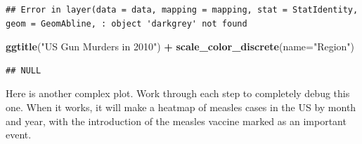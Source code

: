 \documentclass[
]{book}
\newenvironment{Shaded}{\begin{snugshade}}{\end{snugshade}}
\newcommand{\DataTypeTok}[1]{\textcolor[rgb]{0.13,0.29,0.53}{#1}}
\newcommand{\KeywordTok}[1]{\textcolor[rgb]{0.13,0.29,0.53}{\textbf{#1}}}
\newcommand{\NormalTok}[1]{#1}
\newcommand{\OperatorTok}[1]{\textcolor[rgb]{0.81,0.36,0.00}{\textbf{#1}}}
\newcommand{\StringTok}[1]{\textcolor[rgb]{0.31,0.60,0.02}{#1}}
\begin{document}
\begin{verbatim}
## Error in layer(data = data, mapping = mapping, stat = StatIdentity, geom = GeomAbline, : object 'darkgrey' not found
\end{verbatim}

\begin{Shaded}
\begin{Highlighting}[]
  \KeywordTok{ggtitle}\NormalTok{(}\StringTok{"US Gun Murders in 2010"}\NormalTok{) }\OperatorTok{+}
\StringTok{  }\KeywordTok{scale_color_discrete}\NormalTok{(}\DataTypeTok{name=}\StringTok{"Region"}\NormalTok{)}
\end{Highlighting}
\end{Shaded}

\begin{verbatim}
## NULL
\end{verbatim}

Here is another complex plot.
Work through each step to completely debug this one.
When it works, it will make a heatmap of measles cases in the US
by month and year, with the introduction of the measles vaccine
marked as an important event.
\end{document}
